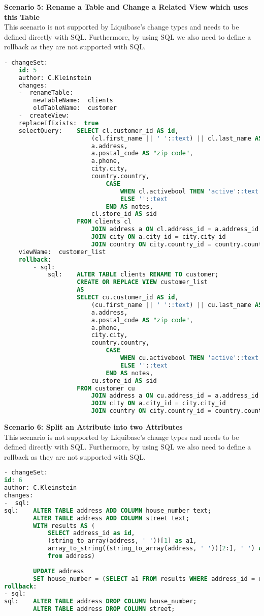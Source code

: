 \newpage
\textbf{Scenario 5: Rename a Table and Change a Related View which uses this Table}\\
%
This scenario is not supported by Liquibase's change types and needs to be defined directly with SQL. Furthermore, by using SQL we also need to define a rollback as they are not supported with SQL.
\begin{lstlisting}[language=SQL, caption={SQL Changeset Scenario 5: Rename a Table and Change a Related View which uses this Table}, label=list:scenarions:LiquibaseSQLScen5]
- changeSet:
	id: 5
	author: C.Kleinstein
	changes:  
	-  renameTable:   
		newTableName:  clients  
		oldTableName:  customer 
	-  createView:         
	replaceIfExists:  true    
	selectQuery:  	SELECT cl.customer_id AS id,
						(cl.first_name || ' '::text) || cl.last_name AS name,
						a.address,
						a.postal_code AS "zip code",
						a.phone,
						city.city,
						country.country,
							CASE
								WHEN cl.activebool THEN 'active'::text
								ELSE ''::text
							END AS notes,
						cl.store_id AS sid
					FROM clients cl
						JOIN address a ON cl.address_id = a.address_id
						JOIN city ON a.city_id = city.city_id
						JOIN country ON city.country_id = country.country_id;
	viewName:  customer_list
	rollback:
		- sql:
			sql: 	ALTER TABLE clients RENAME TO customer; 
					CREATE OR REPLACE VIEW customer_list
					AS
					SELECT cu.customer_id AS id,
						(cu.first_name || ' '::text) || cu.last_name AS name,
						a.address,
						a.postal_code AS "zip code",
						a.phone,
						city.city,
						country.country,
							CASE
								WHEN cu.activebool THEN 'active'::text
								ELSE ''::text
							END AS notes,
						cu.store_id AS sid
					FROM customer cu
						JOIN address a ON cu.address_id = a.address_id
						JOIN city ON a.city_id = city.city_id
						JOIN country ON city.country_id = country.country_id;

\end{lstlisting}

\newpage
\textbf{Scenario 6: Split an Attribute into two Attributes}\\
%
This scenario is not supported by Liquibase's change types and needs to be defined directly with SQL. Furthermore, by using SQL we also need to define a rollback as they are not supported with SQL.
\begin{lstlisting}[language=SQL, caption={SQL Changeset Scenario 6: Split an Attribute into two Attributes}, label=list:scenarions:LiquibaseSQLScen6]
- changeSet:
id: 6
author: C.Kleinstein
changes:
-  sql:
sql: 	ALTER TABLE address ADD COLUMN house_number text; 
		ALTER TABLE address ADD COLUMN street text; 
		WITH results AS (
			SELECT address_id as id,
			(string_to_array(address, ' '))[1] as a1,
			array_to_string((string_to_array(address, ' '))[2:], ' ') as a2
			from address) 
			
		UPDATE address 
		SET house_number = (SELECT a1 FROM results WHERE address_id = results.id), street = (SELECT a2 FROM results WHERE address_id = results.id);
rollback:
- sql:
sql:	ALTER TABLE address DROP COLUMN house_number; 
		ALTER TABLE address DROP COLUMN street;
\end{lstlisting}

